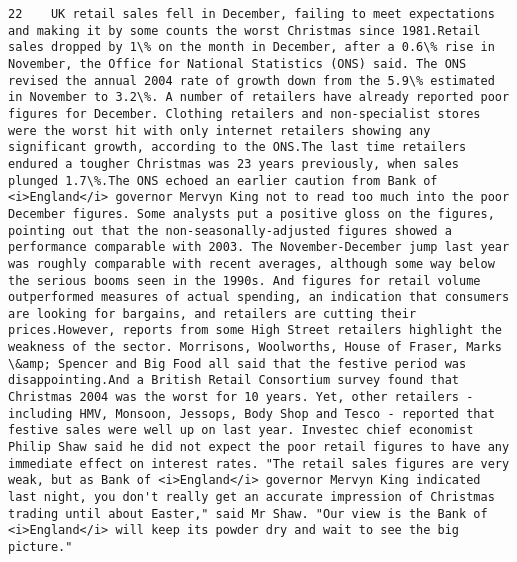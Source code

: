 \documentclass[11pt]{article}
\begin{document}
\begin{Verbatim}[commandchars=\\\{\}]
         22    UK retail sales fell in December, failing to meet expectations and making it by some counts the worst Christmas since 1981.Retail sales dropped by 1\% on the month in December, after a 0.6\% rise in November, the Office for National Statistics (ONS) said. The ONS revised the annual 2004 rate of growth down from the 5.9\% estimated in November to 3.2\%. A number of retailers have already reported poor figures for December. Clothing retailers and non-specialist stores were the worst hit with only internet retailers showing any significant growth, according to the ONS.The last time retailers endured a tougher Christmas was 23 years previously, when sales plunged 1.7\%.The ONS echoed an earlier caution from Bank of <i>England</i> governor Mervyn King not to read too much into the poor December figures. Some analysts put a positive gloss on the figures, pointing out that the non-seasonally-adjusted figures showed a performance comparable with 2003. The November-December jump last year was roughly comparable with recent averages, although some way below the serious booms seen in the 1990s. And figures for retail volume outperformed measures of actual spending, an indication that consumers are looking for bargains, and retailers are cutting their prices.However, reports from some High Street retailers highlight the weakness of the sector. Morrisons, Woolworths, House of Fraser, Marks \&amp; Spencer and Big Food all said that the festive period was disappointing.And a British Retail Consortium survey found that Christmas 2004 was the worst for 10 years. Yet, other retailers - including HMV, Monsoon, Jessops, Body Shop and Tesco - reported that festive sales were well up on last year. Investec chief economist Philip Shaw said he did not expect the poor retail figures to have any immediate effect on interest rates. "The retail sales figures are very weak, but as Bank of <i>England</i> governor Mervyn King indicated last night, you don't really get an accurate impression of Christmas trading until about Easter," said Mr Shaw. "Our view is the Bank of <i>England</i> will keep its powder dry and wait to see the big picture."                                                                                                                                                                                                                                                                                                                                                                                                                                                                                                                                                                                                                                                                                                                                                                                                                                                                                                                                                                                                                                                                                                                                                                              
\end{Verbatim}
\end{document}
